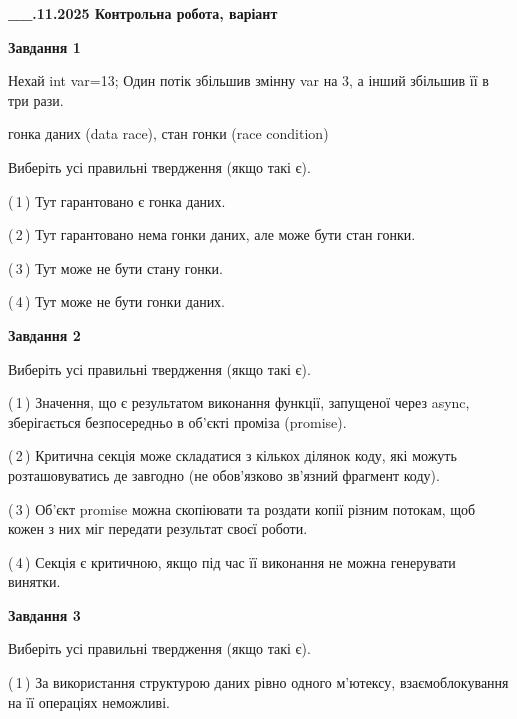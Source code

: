 \documentclass[12pt, ukrainian]{article}
\begin{document}
\begin {large}

\textbf{\_\_.11.2025 Контрольна робота, варіант  }\par


{

\begin{center}
\textbf{Завдання 1}
\end{center}
Нехай int var=13; Один потік збільшив змінну var на 3, а інший збільшив її в три рази.

гонка даних (data race), стан гонки (race condition)

Виберіть усі правильні твердження (якщо такі є).\par
\vspace{2mm}
(\,1\,) Тут гарантовано є гонка даних.%

(\,2\,) Тут гарантовано нема гонки даних, але може бути стан гонки.%

(\,3\,) Тут може не бути стану гонки.%

(\,4\,) Тут може не бути гонки даних.%



\begin{center}
\textbf{Завдання 2}
\end{center}
Виберіть усі правильні твердження (якщо такі є).\par
\vspace{2mm}

(\,1\,) Значення, що є результатом виконання функції, запущеної через async, зберігається безпосередньо в об’єкті проміза (promise).%

(\,2\,) Критична секція може складатися з кількох ділянок коду, які можуть розташовуватись де завгодно (не обов’язково зв’язний фрагмент коду).%

(\,3\,) Об’єкт promise можна скопіювати та роздати копії різним потокам, щоб кожен з них міг передати результат своєї роботи.%

(\,4\,) Секція є критичною, якщо під час її виконання не можна генерувати винятки.%



\begin{center}
\textbf{Завдання 3}
\end{center}
Виберіть усі правильні твердження (якщо такі є).\par
\vspace{2mm}

(\,1\,) За використання структурою даних рівно одного м’ютексу, взаємоблокування на її операціях неможливі.%

}
\end{large}
\end{document}
